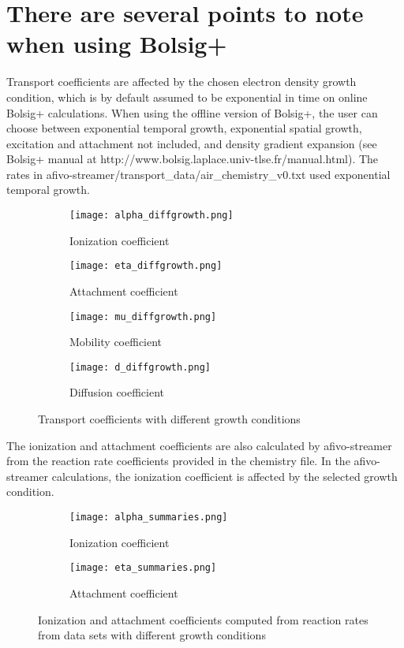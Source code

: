 \documentclass[a4paper, 12pt]{article}
\begin{document}
\section*{There are several points to note when using Bolsig+}

	Transport coefficients are affected by the chosen electron density growth condition, which is by default assumed to be exponential in time on online Bolsig+ calculations. When using the offline version of Bolsig+, the user can choose between exponential temporal growth, exponential spatial growth, excitation and attachment not included, and density gradient expansion (see Bolsig+ manual at http://www.bolsig.laplace.univ-tlse.fr/manual.html). The rates in afivo-streamer/transport{\_}data/air{\_}chemistry{\_}v0.txt used exponential temporal growth.

	\begin{figure}[H]
		\centering
		\begin{subfigure}[H]{0.4\textwidth}
			\texttt{[image: alpha\_diffgrowth.png]}
			\caption{Ionization coefficient}
		\end{subfigure}
		\begin{subfigure}[H]{0.4\textwidth}
			\texttt{[image: eta\_diffgrowth.png]}
			\caption{Attachment coefficient}
		\end{subfigure}
		\begin{subfigure}[H]{0.4\textwidth}
			\texttt{[image: mu\_diffgrowth.png]}
			\caption{Mobility coefficient}
		\end{subfigure}
		\begin{subfigure}[H]{0.4\textwidth}
			\texttt{[image: d\_diffgrowth.png]}
			\caption{Diffusion coefficient}
		\end{subfigure}
		\caption{Transport coefficients with different growth conditions}
	\end{figure}
	
	The ionization and attachment coefficients are also calculated by afivo-streamer from the reaction rate coefficients provided in the chemistry file. In the afivo-streamer calculations, the ionization coefficient is affected by the selected growth condition.
    
    \begin{figure}[H]
		\centering
		\begin{subfigure}[H]{0.4\textwidth}
			\texttt{[image: alpha\_summaries.png]}
			\caption{Ionization coefficient}
		\end{subfigure}
		\begin{subfigure}[H]{0.4\textwidth}
			\texttt{[image: eta\_summaries.png]}
			\caption{Attachment coefficient}
		\end{subfigure}
		\caption{Ionization and attachment coefficients computed from reaction rates from data sets with different growth conditions}
	\end{figure}	
	
\end{document}
